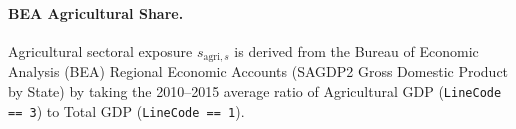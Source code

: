 


\paragraph{BEA Agricultural Share.} Agricultural sectoral exposure $s_{\text{agri}, s}$ is derived from the Bureau of Economic Analysis (BEA) Regional Economic Accounts (SAGDP2 Gross Domestic Product by State) \citep{bea2015sagdp} by taking the 2010--2015 average ratio of Agricultural GDP (\texttt{LineCode == 3}) to Total GDP (\texttt{LineCode == 1}).

